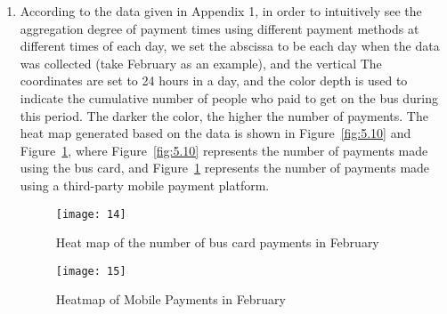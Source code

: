 \documentclass[../mcmpaper]{subfiles}
\begin{document}
\begin{enumerate}[label=\arabic*., format=\bfseries, itemindent=0pt, leftmargin=0pt, topsep=0pt, listparindent=\parindent, itemsep=1pt]
    \item According to the data given in Appendix 1, in order to intuitively see the aggregation degree of payment times using different payment methods at different times of each day, we set the abscissa to be each day when the data was collected (take February as an example), and the vertical The coordinates are set to 24 hours in a day, and the color depth is used to indicate the cumulative number of people who paid to get on the bus during this period. The darker the color, the higher the number of payments. The heat map generated based on the data is shown in Figure~\ref{fig:5.10} and Figure~\ref{fig:5.11}, where Figure~\ref{fig:5.10} represents the number of payments made using the bus card, and Figure~\ref{fig:5.11} represents the number of payments made using a third-party mobile payment platform.
\begin{figure}[!ht]
\centering
\begin{minipage}[c]{0.48\linewidth}
    \centering
    \texttt{[image: 14]}
    \caption{Heat map of the number of bus card payments in February}
    \label{fig:5.10}
\end{minipage}
\quad
\begin{minipage}[c]{0.48\linewidth}
    \centering
    \texttt{[image: 15]}
    \caption{Heatmap of Mobile Payments in February}
    \label{fig:5.11}
    \end{minipage}
\end{figure}
\end{enumerate}
\end{document}
